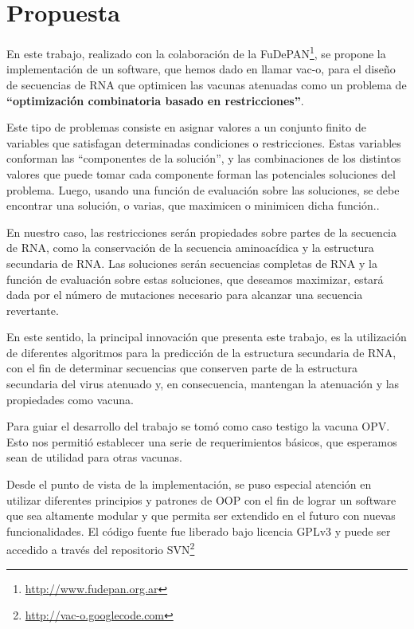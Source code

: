 \section{Propuesta}
\label{propuesta}
En este trabajo, realizado con la colaboraci\'on de la
\ac{FuDePAN}\footnote{\url{http://www.fudepan.org.ar}}, se propone la
implementaci\'on de un software, que hemos dado en llamar \ac{vac-o}, para el
dise\~no de secuencias de \ac{RNA} que optimicen las vacunas atenuadas como un
problema de \textbf{``optimizaci\'on combinatoria basado en restricciones''}. 

Este tipo de problemas consiste en asignar valores a un conjunto finito de
variables que satisfagan determinadas condiciones o restricciones. Estas
variables conforman las ``componentes de la soluci\'on'', y las combinaciones de
los distintos valores que puede tomar cada componente forman las potenciales
soluciones del problema. Luego, usando una funci\'on de evaluaci\'on sobre las
soluciones, se debe encontrar una soluci\'on, o varias, que maximicen o
minimicen dicha funci\'on.\cite{Hoos04}.

En nuestro caso, las restricciones ser\'an propiedades sobre partes de la
secuencia de \ac{RNA}, como la conservaci\'on de la secuencia aminoac\'idica y
la estructura secundaria de \ac{RNA}. Las soluciones ser\'an secuencias
completas de \ac{RNA} y la funci\'on de evaluaci\'on sobre estas soluciones, que
deseamos maximizar, estar\'a dada por el n\'umero de mutaciones necesario para
alcanzar una secuencia revertante.

En este sentido, la principal innovaci\'on que presenta este trabajo, es la
utilizaci\'on de diferentes algoritmos para la predicci\'on de la estructura
secundaria de \ac{RNA}, con el fin de determinar secuencias que conserven parte
de la estructura secundaria del virus atenuado y, en consecuencia, mantengan la
atenuaci\'on y las propiedades como vacuna.

Para guiar el desarrollo del trabajo se tom\'o como caso testigo la vacuna
\ac{OPV}. Esto nos permiti\'o establecer una serie de requerimientos b\'asicos,
que esperamos sean de utilidad para otras vacunas.

Desde el punto de vista de la implementaci\'on, se puso especial atenci\'on en
utilizar diferentes principios y patrones de \ac{OOP} con
el fin de lograr un software que sea altamente modular y que permita ser
extendido en el futuro con nuevas funcionalidades. El c\'odigo fuente fue
liberado bajo licencia \ac{GPLv3} y puede ser accedido a trav\'es del
repositorio \ac{SVN}\footnote{\url{http://vac-o.googlecode.com}}